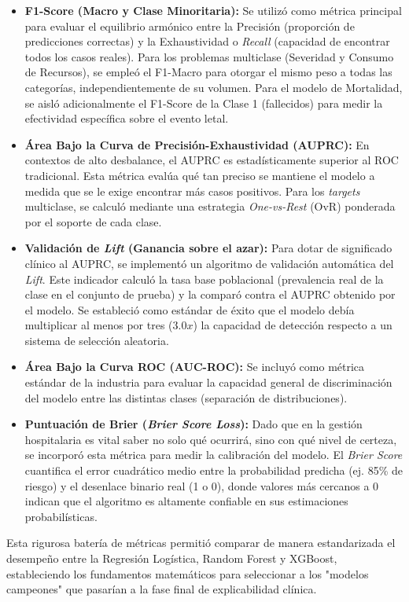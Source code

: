 \begin{itemize}
    \item \textbf{F1-Score (Macro y Clase Minoritaria):} Se utilizó como métrica principal para evaluar el equilibrio armónico entre la Precisión (proporción de predicciones correctas) y la Exhaustividad o \textit{Recall} (capacidad de encontrar todos los casos reales). Para los problemas multiclase (Severidad y Consumo de Recursos), se empleó el F1-Macro para otorgar el mismo peso a todas las categorías, independientemente de su volumen. Para el modelo de Mortalidad, se aisló adicionalmente el F1-Score de la Clase 1 (fallecidos) para medir la efectividad específica sobre el evento letal.
    \item \textbf{Área Bajo la Curva de Precisión-Exhaustividad (AUPRC):} En contextos de alto desbalance, el AUPRC es estadísticamente superior al ROC tradicional. Esta métrica evalúa qué tan preciso se mantiene el modelo a medida que se le exige encontrar más casos positivos. Para los \textit{targets} multiclase, se calculó mediante una estrategia \textit{One-vs-Rest} (OvR) ponderada por el soporte de cada clase.
    \item \textbf{Validación de \textit{Lift} (Ganancia sobre el azar):} Para dotar de significado clínico al AUPRC, se implementó un algoritmo de validación automática del \textit{Lift}. Este indicador calculó la tasa base poblacional (prevalencia real de la clase en el conjunto de prueba) y la comparó contra el AUPRC obtenido por el modelo. Se estableció como estándar de éxito que el modelo debía multiplicar al menos por tres ($3.0x$) la capacidad de detección respecto a un sistema de selección aleatoria.
    \item \textbf{Área Bajo la Curva ROC (AUC-ROC):} Se incluyó como métrica estándar de la industria para evaluar la capacidad general de discriminación del modelo entre las distintas clases (separación de distribuciones).
    \item \textbf{Puntuación de Brier (\textit{Brier Score Loss}):} Dado que en la gestión hospitalaria es vital saber no solo qué ocurrirá, sino con qué nivel de certeza, se incorporó esta métrica para medir la calibración del modelo. El \textit{Brier Score} cuantifica el error cuadrático medio entre la probabilidad predicha (ej. 85\% de riesgo) y el desenlace binario real (1 o 0), donde valores más cercanos a 0 indican que el algoritmo es altamente confiable en sus estimaciones probabilísticas.
\end{itemize}

Esta rigurosa batería de métricas permitió comparar de manera estandarizada el desempeño entre la Regresión Logística, Random Forest y XGBoost, estableciendo los fundamentos matemáticos para seleccionar a los "modelos campeones" que pasarían a la fase final de explicabilidad clínica.